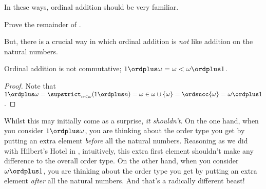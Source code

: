 \documentclass[../../../include/open-logic-section]{subfiles}
\begin{document}
In these ways, ordinal addition should be very familiar. 

\begin{prob}
Prove the remainder of
.
\end{prob}

But, there is a crucial way in which ordinal addition is \emph{not}
like addition on the natural numbers.

\begin{prop}
Ordinal addition is {not} commutative; $1 \ordplus  \omega = \omega <
\omega \ordplus  1$.
\end{prop}

\begin{proof}
Note that $1 \ordplus  \omega = \supstrict_{n < \omega} (1 \ordplus n)
= \omega \in \omega \cup \{\omega\} = \ordsucc{\omega} = \omega
\ordplus  1$.
\end{proof}

Whilst this may initially come as a surprise, \emph{it shouldn't}. On
the one hand, when you consider $1 \ordplus  \omega$, you are thinking
about the order type you get by putting an extra element \emph{before}
all the natural numbers. Reasoning as we did with Hilbert's Hotel in
, intuitively, this extra first
element shouldn't make any difference to the overall order type. On
the other hand, when you consider $\omega \ordplus  1$, you are
thinking about the order type you get by putting an extra element
\emph{after} all the natural numbers. And that's a radically different
beast!
\end{document}
